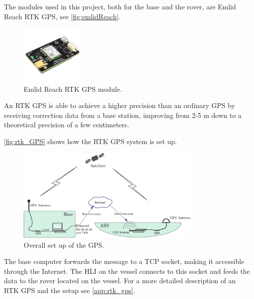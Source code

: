 The modules used in this project, both for the base and the rover, are Emlid Reach RTK GPS, see \autoref{fig:emlidReach}.

\begin{figure}[H]
  \includegraphics[width=0.27\textwidth]{figures/emlidReach}
  \caption{Emlid Reach RTK GPS module.\cite{EmlidReachDocs}}
  \label{fig:emlidReach}
\end{figure}


An RTK GPS is able to achieve a higher precision than an ordinary GPS by receiving correction data from a base station, improving from 2-5 m down to a theoretical precision of a few centimeters. \cite{EmlidRTK}


\autoref{fig:rtk_GPS} shows how the RTK GPS system is set up. 

\begin{figure}[H]
	\includegraphics[width=0.8\textwidth]{figures/comunicationSetup.pdf}
	\caption{Overall set up of the GPS.}
	\label{fig:rtk_GPS}
\end{figure}

The base computer forwards the message to a TCP socket, making it accessible through the Internet. The HLI on the vessel connects to this socket and feeds the data to the rover located on the vessel. For a more detailed description of an RTK GPS and the setup see \autoref{app:rtk_gps}.
